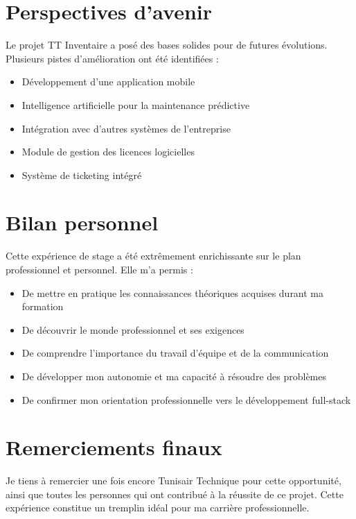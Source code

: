\section*{Perspectives d'avenir}

Le projet TT Inventaire a posé des bases solides pour de futures évolutions. Plusieurs pistes d'amélioration ont été identifiées :

\begin{itemize}
    \item Développement d'une application mobile
    \item Intelligence artificielle pour la maintenance prédictive
    \item Intégration avec d'autres systèmes de l'entreprise
    \item Module de gestion des licences logicielles
    \item Système de ticketing intégré
\end{itemize}

\section*{Bilan personnel}

Cette expérience de stage a été extrêmement enrichissante sur le plan professionnel et personnel. Elle m'a permis :

\begin{itemize}
    \item De mettre en pratique les connaissances théoriques acquises durant ma formation
    \item De découvrir le monde professionnel et ses exigences
    \item De comprendre l'importance du travail d'équipe et de la communication
    \item De développer mon autonomie et ma capacité à résoudre des problèmes
    \item De confirmer mon orientation professionnelle vers le développement full-stack
\end{itemize}

\section*{Remerciements finaux}

Je tiens à remercier une fois encore Tunisair Technique pour cette opportunité, ainsi que toutes les personnes qui ont contribué à la réussite de ce projet. Cette expérience constitue un tremplin idéal pour ma carrière professionnelle.

